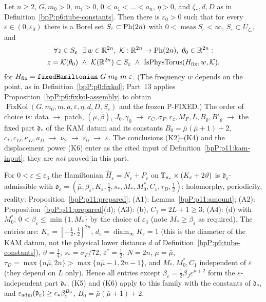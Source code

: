 \begin{theorem}\label{bpP:p11:wrapper}
Let $n\ge2$, $G,m_0>0$, $m_i>0$, $0<a_1<\dots<a_n$, $\eta>0$, and $\zeta_*,d,D$ as in Definition~\ref{bpP:p6:tube-constants}. Then there is $\varepsilon_0>0$ such that for every $\varepsilon\in(0,\varepsilon_0)$ there is a Borel set $S_\varepsilon\subset\mathrm{Ph}(2n)$ with $0<\operatorname{meas}S_\varepsilon<\infty$, $S_\varepsilon\subset U_{\zeta_*}$, and
\begin{multline*}\forall z\in S_\varepsilon\ \ \exists\,w\in\R^{2n},\ \mathcal K:\R^{2n}\to\Ph{2n},\ \theta_0\in\R^{2n}:\\ z=\mathcal K(\theta_0)\ \wedge\ \mathcal K(\R^{2n})\subset S_\varepsilon\ \wedge\ \operatorname{IsPhysTorus}(H_{\rm fix},w,\mathcal K),\end{multline*}
for $H_{\rm fix}=\texttt{fixedHamiltonian}\ G\ m_0\ m\ \varepsilon$. (The frequency $w$ depends on the point, as in Definition~\ref{bpP:p0:fixkol}; Part~13 applies Proposition~\ref{bpP:p6:fixkol-assembly} to obtain $\operatorname{FixKol}(G,m_0,m,a,\varepsilon,\eta,d,D,S_\varepsilon)$ and the frozen P-FIXED.) The order of choice is: data $\to$ patch, $(\bar\mu,\bar\beta)$, $J_0,\gamma_0$ $\to$ $r_C,\sigma_F,r_z,M_F,L,B_\varrho,B'_\varrho$ $\to$ the fixed part $\mathfrak d_*$ of the KAM datum and its constants $B_0=\bar\mu(\bar\mu+1)+2$, $c_*,c_D,\kappa_D,a_D$ $\to$ $\nu_2$ $\to$ $\varepsilon_0$ $\to$ $\varepsilon$. The conclusions (K2)--(K4) and the displacement power (K6) enter as the cited input of Definition~\ref{bpP:p11:kam-input}; they are \emph{not} proved in this part.
\end{theorem}

\begin{remark}\label{bpP:p11:data-star}
For $0<\varepsilon\le\varepsilon_3$ the Hamiltonian $\hat H_\varepsilon=N_\varepsilon+P_\varepsilon$ on $\mathbb{T}_{s_*}\times(K_\varepsilon+2\vartheta)$ is $\mathfrak d_\varepsilon$-admissible with $\mathfrak d_\varepsilon=(\bar\mu,\beta_\varepsilon,K_\varepsilon,\frac14,s_*,M_*,M_0^*,C_1,\tau_D,\frac12)$: holomorphy, periodicity, reality: Proposition~\ref{bpP:p11:prepared}; (A1): Lemma~\ref{bpP:p11:amount}; (A2): Proposition~\ref{bpP:p11:prepared}(d); (A3): (b), $C_1=2L+1\ge3$; (A4): (d) with $M_0^*$; $0<\beta_\varepsilon\le\min\{1,M_*\}$ by the choice of $\varepsilon_3$ (note $M_*\ge\beta_\varepsilon$ as required). The entries are: $K_\varepsilon=[-\frac12,\frac12]^{2n}$, $d_\varepsilon=\operatorname{diam}_\infty K_\varepsilon=1$ (this is the diameter of the KAM datum, not the physical lower distance $d$ of Definition~\ref{bpP:p6:tube-constants}), $\vartheta=\frac14$, $s_*=\sigma_F/72$, $\varepsilon^*=\frac12$, $N=2n$, $\mu=\bar\mu$, $\tau_D=\max\{n\bar\mu,2n\}>\max\{n\bar\mu-1,2n-1\}$, and $M_*,M_0^*,C_1$ independent of $\varepsilon$ (they depend on $L$ only). Hence all entries except $\beta_\varepsilon=\frac12\beta_J\varepsilon^{\bar\mu+2}$ form the $\varepsilon$-independent part $\mathfrak d_*$; (K5) and (K6) apply to this family with the constants of $\mathfrak d_*$, and $\varepsilon_{\rm adm}(\mathfrak d_\varepsilon)\ge c_*\beta_\varepsilon^{B_0}$, $B_0=\bar\mu(\bar\mu+1)+2$.
\end{remark}

